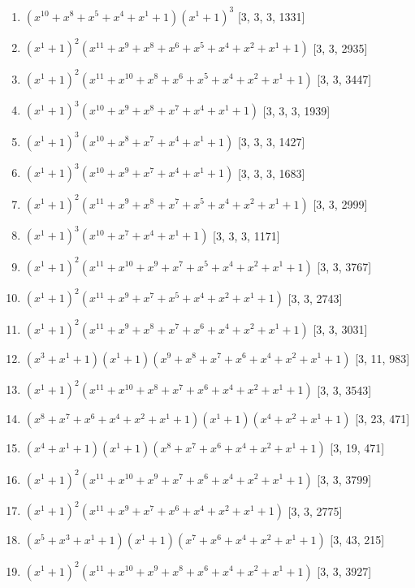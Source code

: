 \documentclass[10pt,twocolumn]{article}
\begin{document}
\begin{enumerate}
\item $(x^{10} + x^{8} + x^{5} + x^{4} + x^{1} + 1)(x^{1} + 1)^{3}$  [3, 3, 3, 1331]
\item $(x^{1} + 1)^{2}(x^{11} + x^{9} + x^{8} + x^{6} + x^{5} + x^{4} + x^{2} + x^{1} + 1)$  [3, 3, 2935]
\item $(x^{1} + 1)^{2}(x^{11} + x^{10} + x^{8} + x^{6} + x^{5} + x^{4} + x^{2} + x^{1} + 1)$  [3, 3, 3447]
\item $(x^{1} + 1)^{3}(x^{10} + x^{9} + x^{8} + x^{7} + x^{4} + x^{1} + 1)$  [3, 3, 3, 1939]
\item $(x^{1} + 1)^{3}(x^{10} + x^{8} + x^{7} + x^{4} + x^{1} + 1)$  [3, 3, 3, 1427]
\item $(x^{1} + 1)^{3}(x^{10} + x^{9} + x^{7} + x^{4} + x^{1} + 1)$  [3, 3, 3, 1683]
\item $(x^{1} + 1)^{2}(x^{11} + x^{9} + x^{8} + x^{7} + x^{5} + x^{4} + x^{2} + x^{1} + 1)$  [3, 3, 2999]
\item $(x^{1} + 1)^{3}(x^{10} + x^{7} + x^{4} + x^{1} + 1)$  [3, 3, 3, 1171]
\item $(x^{1} + 1)^{2}(x^{11} + x^{10} + x^{9} + x^{7} + x^{5} + x^{4} + x^{2} + x^{1} + 1)$  [3, 3, 3767]
\item $(x^{1} + 1)^{2}(x^{11} + x^{9} + x^{7} + x^{5} + x^{4} + x^{2} + x^{1} + 1)$  [3, 3, 2743]
\item $(x^{1} + 1)^{2}(x^{11} + x^{9} + x^{8} + x^{7} + x^{6} + x^{4} + x^{2} + x^{1} + 1)$  [3, 3, 3031]
\item $(x^{3} + x^{1} + 1)(x^{1} + 1)(x^{9} + x^{8} + x^{7} + x^{6} + x^{4} + x^{2} + x^{1} + 1)$  [3, 11, 983]
\item $(x^{1} + 1)^{2}(x^{11} + x^{10} + x^{8} + x^{7} + x^{6} + x^{4} + x^{2} + x^{1} + 1)$  [3, 3, 3543]
\item $(x^{8} + x^{7} + x^{6} + x^{4} + x^{2} + x^{1} + 1)(x^{1} + 1)(x^{4} + x^{2} + x^{1} + 1)$  [3, 23, 471]
\item $(x^{4} + x^{1} + 1)(x^{1} + 1)(x^{8} + x^{7} + x^{6} + x^{4} + x^{2} + x^{1} + 1)$  [3, 19, 471]
\item $(x^{1} + 1)^{2}(x^{11} + x^{10} + x^{9} + x^{7} + x^{6} + x^{4} + x^{2} + x^{1} + 1)$  [3, 3, 3799]
\item $(x^{1} + 1)^{2}(x^{11} + x^{9} + x^{7} + x^{6} + x^{4} + x^{2} + x^{1} + 1)$  [3, 3, 2775]
\item $(x^{5} + x^{3} + x^{1} + 1)(x^{1} + 1)(x^{7} + x^{6} + x^{4} + x^{2} + x^{1} + 1)$  [3, 43, 215]
\item $(x^{1} + 1)^{2}(x^{11} + x^{10} + x^{9} + x^{8} + x^{6} + x^{4} + x^{2} + x^{1} + 1)$  [3, 3, 3927]

\end{enumerate}
\end{document}
